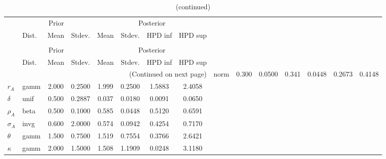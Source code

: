  
\begin{center}
\begin{longtable}{llcccccc} 
\caption{Results from Metropolis-Hastings (parameters)}
 \label{Table:MHPosterior:1}\\
\toprule 
  & \multicolumn{3}{c}{Prior}  &  \multicolumn{4}{c}{Posterior} \\
  \cmidrule(r{.75em}){2-4} \cmidrule(r{.75em}){5-8}
  & Dist. & Mean  & Stdev. & Mean & Stdev. & HPD inf & HPD sup\\
\midrule \endfirsthead 
\caption{(continued)}\\\toprule 
  & \multicolumn{3}{c}{Prior}  &  \multicolumn{4}{c}{Posterior} \\
  \cmidrule(r{.75em}){2-4} \cmidrule(r{.75em}){5-8}
  & Dist. & Mean  & Stdev. & Mean & Stdev. & HPD inf & HPD sup\\
\midrule \endhead 
\bottomrule \multicolumn{8}{r}{(Continued on next page)} \endfoot 
\bottomrule \endlastfoot 
${\alpha}$ & norm &   0.300 & 0.0500 &   0.341& 0.0448 &  0.2673 &  0.4148 \\ 
${r_{A}}$ & gamm &   2.000 & 0.2500 &   1.999& 0.2500 &  1.5883 &  2.4058 \\ 
${\delta}$ & unif &   0.500 & 0.2887 &   0.037& 0.0180 &  0.0091 &  0.0650 \\ 
${\rho_A}$ & beta &   0.500 & 0.1000 &   0.585& 0.0448 &  0.5120 &  0.6591 \\ 
${\sigma_A}$ & invg &   0.600 & 2.0000 &   0.574& 0.0942 &  0.4254 &  0.7170 \\ 
${\theta}$ & gamm &   1.500 & 0.7500 &   1.519& 0.7554 &  0.3766 &  2.6421 \\ 
${\kappa}$ & gamm &   2.000 & 1.5000 &   1.508& 1.1909 &  0.0248 &  3.1180 \\ 
\end{longtable}
 \end{center}

